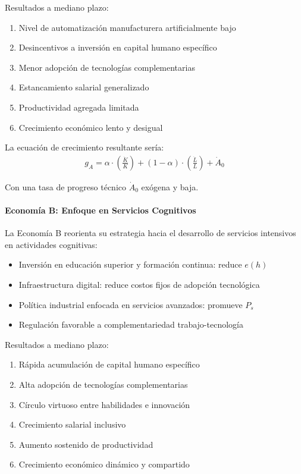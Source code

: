 \documentclass{article}
\theoremstyle{remark}
\theoremstyle{definition}
\begin{document}
\begin{tcolorbox}
Resultados a mediano plazo:
\begin{enumerate}
\item Nivel de automatización manufacturera artificialmente bajo
\item Desincentivos a inversión en capital humano específico
\item Menor adopción de tecnologías complementarias
\item Estancamiento salarial generalizado
\item Productividad agregada limitada
\item Crecimiento económico lento y desigual
\end{enumerate}

La ecuación de crecimiento resultante sería:
\begin{align}
g_A = \alpha \cdot \left( \frac{\dot{K}}{K} \right) + (1-\alpha) \cdot \left( \frac{\dot{L}}{L} \right) + \dot{A}_0
\end{align}

Con una tasa de progreso técnico $\dot{A}_0$ exógena y baja.

\paragraph{Economía B: Enfoque en Servicios Cognitivos}
La Economía B reorienta su estrategia hacia el desarrollo de servicios intensivos en actividades cognitivas:
\begin{itemize}
\item Inversión en educación superior y formación continua: reduce $e(h)$
\item Infraestructura digital: reduce costos fijos de adopción tecnológica
\item Política industrial enfocada en servicios avanzados: promueve $P_s$
\item Regulación favorable a complementariedad trabajo-tecnología
\end{itemize}

Resultados a mediano plazo:
\begin{enumerate}
\item Rápida acumulación de capital humano específico
\item Alta adopción de tecnologías complementarias
\item Círculo virtuoso entre habilidades e innovación
\item Crecimiento salarial inclusivo
\item Aumento sostenido de productividad
\item Crecimiento económico dinámico y compartido
\end{enumerate}


\end{tcolorbox}
\end{document}
